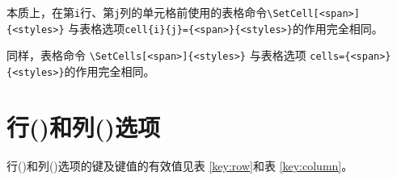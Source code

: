\documentclass[oneside]{book}
\begin{document}
本质上，在第\verb!i!行、第\verb!j!列的单元格前使用的表格命令\verb!\SetCell[<span>]{<styles>}!
与表格选项\verb!cell{i}{j}={<span>}{<styles>}!的作用完全相同。

同样，表格命令 \verb!\SetCells[<span>]{<styles>}!
与表格选项 \verb!cells={<span>}{<styles>}!的作用完全相同。

\section{行()和列()选项}

行()和列()选项的键及键值的有效值见表 \ref{key:row}和表 \ref{key:column}。
\end{document}
